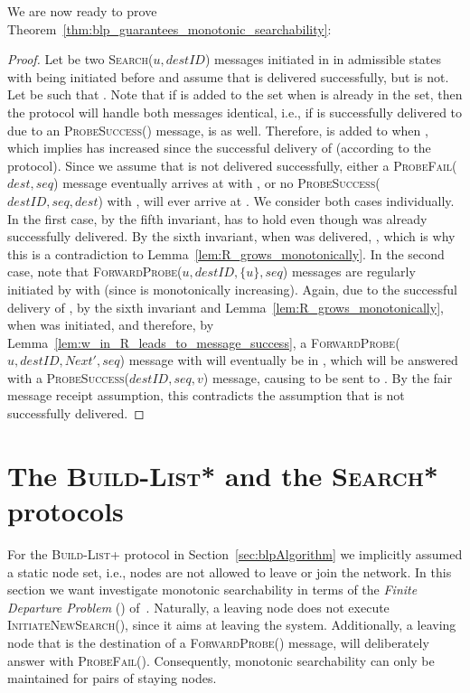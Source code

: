 \documentclass[a4paper,USenglish]{lipics}
\newcommand{\blp}{\textsc{Build-List+}\xspace}
\newcommand{\blpp}{\textsc{Build-List*}\xspace}
\newcommand{\srpp}{\textsc{Search*}\xspace}
\newcommand{\search}[1]{\textsc{Search(\ensuremath{#1})}\xspace}
\newcommand{\initsearch}[1]{\textsc{InitiateNewSearch(\ensuremath{#1})}\xspace}
\newcommand{\forwardprobe}[1]{\textsc{ForwardProbe(\ensuremath{#1})}\xspace}
\newcommand{\psuccess}[1]{\textsc{ProbeSuccess(\ensuremath{#1})}\xspace}
\newcommand{\pfail}[1]{\textsc{ProbeFail(\ensuremath{#1})}\xspace}
\newcommand{\fdp}{\xspace}
\begin{document}
We are now ready to prove Theorem~\ref{thm:blp_guarantees_monotonic_searchability}:
\begin{proof}
  Let  be two \search{u,destID} messages initiated in  in admissible states with  being initiated before  and assume that  is delivered successfully, but  is not.
	Let  be such that .
Note that if  is added to the set  when  is already in the set, then the protocol will handle both messages identical, i.e., if  is successfully delivered to  due to an \psuccess{} message,  is as well.
	Therefore,  is added to  when , which implies  has increased since the successful delivery of  (according to the protocol).
	Since we assume that  is not delivered successfully, either a \pfail{dest,seq} message eventually arrives at  with , or no \psuccess{destID,seq,dest} with ,  will ever arrive at . 
	We consider both cases individually.
	In the first case, by the fifth invariant,  has to hold even though  was already successfully delivered.
	By the sixth invariant, when  was delivered, , which is why this is a contradiction to Lemma~\ref{lem:R_grows_monotonically}.
	In the second case, note that \forwardprobe{u,destID,\{u\},seq} messages are regularly initiated by  with  (since  is monotonically increasing).
	Again, due to the successful delivery of , by the sixth invariant and Lemma~\ref{lem:R_grows_monotonically},  when  was initiated, and therefore, by Lemma~\ref{lem:w_in_R_leads_to_message_success}, a \forwardprobe{u, destID, Next', seq} message with  will eventually be in , which will be answered with a \psuccess{destID, seq, v} message, causing  to be sent to .	
	By the fair message receipt assumption, this contradicts the assumption that  is not successfully delivered.
\end{proof}


\section{The \blpp and the \srpp protocols}
\label{sec:theBLPPAlgorithm}
For the \blp protocol in Section~\ref{sec:blpAlgorithm} we implicitly assumed a static node set, i.e., nodes are not allowed to leave or join the network. In this section we want investigate monotonic searchability in terms of the \emph{Finite Departure Problem} (\fdp) of~\cite{departure1}.
Naturally, a leaving node does not execute \initsearch{}, since it aims at leaving the system. Additionally, a leaving node that is the destination of a \forwardprobe{} message, will deliberately answer with \pfail{}.
Consequently, monotonic searchability can only be maintained for pairs of staying nodes.
\end{document}
